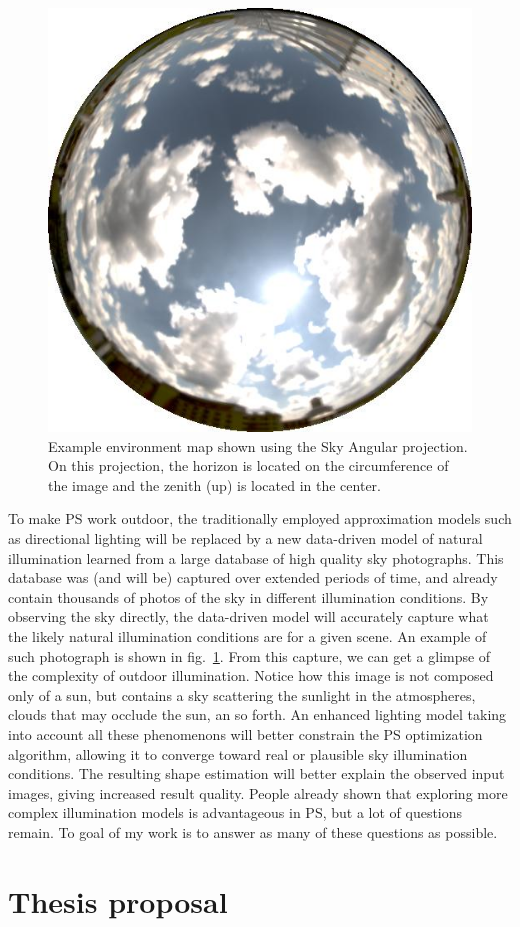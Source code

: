 \begin{figure}
\centering
\includegraphics[width=0.5\linewidth]{./figures/database/20130824_140002.jpg}
\caption{Example environment map shown using the Sky Angular projection. On this projection, the horizon is located on the circumference of the image and the zenith (up) is located in the center.}
\label{fig:envmap_example}
\end{figure}


To make PS work outdoor, the traditionally employed approximation models such as directional lighting will be replaced by a new data-driven model of natural illumination learned from a large database of high quality sky photographs. This database was (and will be) captured over extended periods of time, and already contain thousands of photos of the sky in different illumination conditions. By observing the sky directly, the data-driven model will accurately capture what the likely natural illumination conditions are for a given scene. An example of such photograph is shown in fig.~\ref{fig:envmap_example}. From this capture, we can get a glimpse of the complexity of outdoor illumination. Notice how this image is not composed only of a sun, but contains a sky scattering the sunlight in the atmospheres, clouds that may occlude the sun, an so forth. An enhanced lighting model taking into account all these phenomenons will better constrain the PS optimization algorithm, allowing it to converge toward real or plausible sky illumination conditions. The resulting shape estimation will better explain the observed input images, giving increased result quality. People already shown that exploring more complex illumination models is advantageous in PS, but a lot of questions remain. To goal of my work is to answer as many of these questions as possible.


\section{Thesis proposal}

